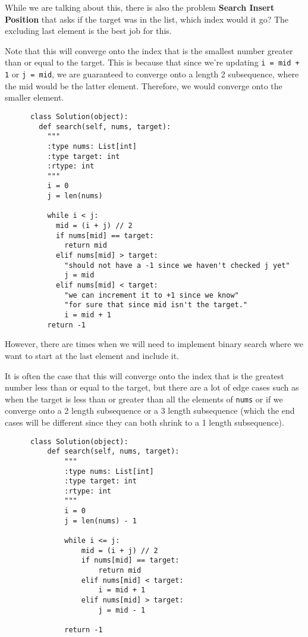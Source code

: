 \documentclass{article}
\begin{document}
  While we are talking about this, there is also the problem \textbf{Search Insert Position} that asks if the target was in the list, which index would it go? The excluding last element is the best job for this. 

  \begin{theorem}
    Note that this will converge onto the index that is the smallest number greater than or equal to the target. This is because that since we're updating \texttt{i = mid + 1} or \texttt{j = mid}, we are guaranteed to converge onto a length 2 subsequence, where the mid would be the latter element. Therefore, we would converge onto the smaller element.  
    \begin{lstlisting}
      class Solution(object):
        def search(self, nums, target):
          """
          :type nums: List[int]
          :type target: int
          :rtype: int
          """
          i = 0 
          j = len(nums)

          while i < j: 
            mid = (i + j) // 2 
            if nums[mid] == target: 
              return mid 
            elif nums[mid] > target: 
              "should not have a -1 since we haven't checked j yet"
              j = mid     
            elif nums[mid] < target: 
              "we can increment it to +1 since we know"
              "for sure that since mid isn't the target."
              i = mid + 1           
          return -1 
    \end{lstlisting}
  \end{theorem}

  However, there are times when we will need to implement binary search where we want to start at the last element and include it. 

  \begin{theorem}
    It is often the case that this will converge onto the index that is the greatest number less than or equal to the target, but there are a lot of edge cases such as when the target is less than or greater than all the elements of \texttt{nums} or if we converge onto a 2 length subsequence or a 3 length subsequence (which the end cases will be different since they can both shrink to a 1 length subsequence).  
    \begin{lstlisting}
      class Solution(object):
          def search(self, nums, target):
              """
              :type nums: List[int]
              :type target: int
              :rtype: int
              """
              i = 0 
              j = len(nums) - 1 

              while i <= j: 
                  mid = (i + j) // 2 
                  if nums[mid] == target: 
                      return mid 
                  elif nums[mid] < target: 
                      i = mid + 1
                  elif nums[mid] > target: 
                      j = mid - 1 

              return -1
    \end{lstlisting} 
  \end{theorem}
\end{document}
